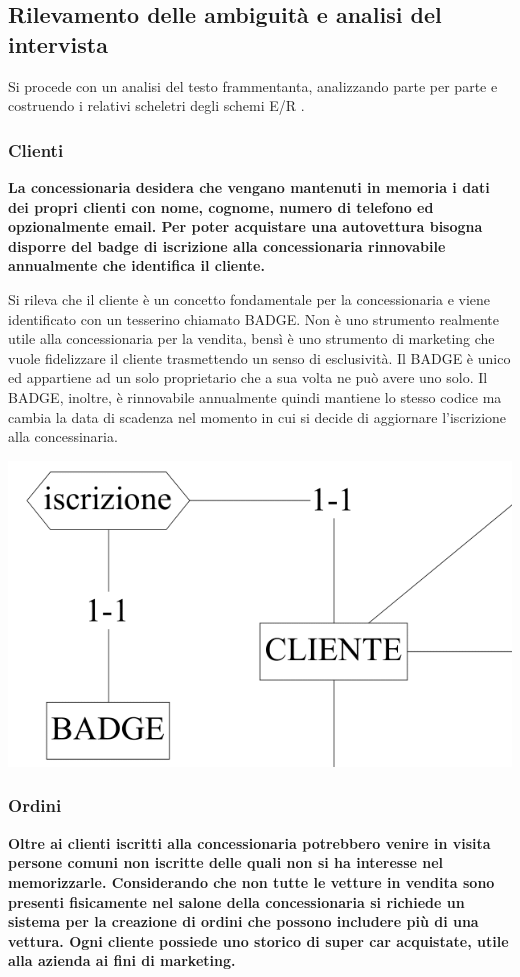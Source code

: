 \documentclass[11pt]{article}
\begin{document}
\subsection{Rilevamento delle ambiguità e analisi del intervista} 

Si procede con un analisi del testo frammentanta, analizzando parte per parte e
costruendo i relativi scheletri degli schemi E/R .

\subsubsection{Clienti}
\textbf{La concessionaria desidera che vengano mantenuti in memoria i dati dei propri
clienti con nome, cognome, numero di telefono ed opzionalmente email. Per poter
acquistare una autovettura bisogna disporre del badge di iscrizione alla
concessionaria rinnovabile annualmente che identifica il cliente.}

Si rileva che il cliente è un concetto fondamentale per la concessionaria e
viene identificato con un tesserino chiamato BADGE. Non è uno strumento
realmente utile alla concessionaria per la vendita, bensì è uno strumento di
marketing che vuole fidelizzare il cliente trasmettendo un senso di esclusività.
Il BADGE è unico ed appartiene ad un solo proprietario che a sua volta ne può
avere uno solo. Il BADGE, inoltre, è rinnovabile annualmente quindi mantiene lo
stesso codice ma cambia la data di scadenza nel momento in cui si decide di
aggiornare l'iscrizione alla concessinaria.

\begin{center}
    \includegraphics[width=\linewidth]{images/partialSchemes/cliente.png}
\end{center}

\subsubsection{Ordini}
\textbf{Oltre ai clienti iscritti alla concessionaria potrebbero venire in visita
persone comuni non iscritte delle quali non si ha interesse nel memorizzarle.
Considerando che non tutte le vetture in vendita sono presenti fisicamente nel
salone della concessionaria si richiede un sistema per la creazione di ordini
che possono includere più di una vettura. Ogni cliente possiede uno storico di
super car acquistate, utile alla azienda ai fini di marketing.}
\end{document}
